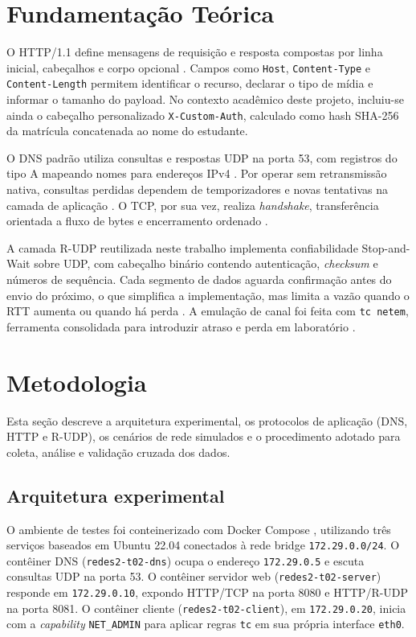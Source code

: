 \documentclass[12pt]{article}
\begin{document}
\section{Fundamentação Teórica}

O HTTP/1.1 define mensagens de requisição e resposta compostas por linha inicial,
cabeçalhos e corpo opcional \cite{rfc2616}. Campos como \texttt{Host},
\texttt{Content-Type} e \texttt{Content-Length} permitem identificar o recurso,
declarar o tipo de mídia e informar o tamanho do payload. No contexto acadêmico
deste projeto, incluiu-se ainda o cabeçalho personalizado \texttt{X-Custom-Auth},
calculado como hash SHA-256 da matrícula concatenada ao nome do estudante.

O DNS padrão utiliza consultas e respostas UDP na porta 53, com registros do
tipo A mapeando nomes para endereços IPv4 \cite{rfc1035}. Por operar sem
retransmissão nativa, consultas perdidas dependem de temporizadores e novas
tentativas na camada de aplicação \cite{kurose2017,tanenbaum2011}. O TCP, por
sua vez, realiza \emph{handshake}, transferência orientada a fluxo de bytes e
encerramento ordenado \cite{rfc793}.

A camada R-UDP reutilizada neste trabalho implementa confiabilidade Stop-and-Wait
sobre UDP, com cabeçalho binário contendo autenticação, \emph{checksum} e
números de sequência. Cada segmento de dados aguarda confirmação antes do envio
do próximo, o que simplifica a implementação, mas limita a vazão quando o RTT
aumenta ou quando há perda \cite{tanenbaum2011}. A emulação de canal foi feita
com \texttt{tc netem}, ferramenta consolidada para introduzir atraso e perda em
laboratório \cite{netem2005}.

\section{Metodologia}

Esta seção descreve a arquitetura experimental, os protocolos de aplicação
(DNS, HTTP e R-UDP), os cenários de rede simulados e o procedimento adotado
para coleta, análise e validação cruzada dos dados.

\subsection{Arquitetura experimental}

O ambiente de testes foi conteinerizado com Docker Compose \cite{docker2024},
utilizando três serviços baseados em Ubuntu 22.04 conectados à rede bridge
\texttt{172.29.0.0/24}. O contêiner DNS (\texttt{redes2-t02-dns}) ocupa o
endereço \texttt{172.29.0.5} e escuta consultas UDP na porta 53. O contêiner
servidor web (\texttt{redes2-t02-server}) responde em \texttt{172.29.0.10},
expondo HTTP/TCP na porta 8080 e HTTP/R-UDP na porta 8081. O contêiner cliente
(\texttt{redes2-t02-client}), em \texttt{172.29.0.20}, inicia com a
\emph{capability} \texttt{NET\_ADMIN} para aplicar regras \texttt{tc} em sua
própria interface \texttt{eth0}.
\end{document}
